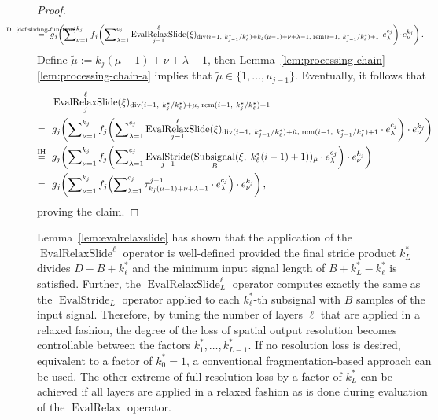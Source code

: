 \documentclass[journal]{IEEEtran}
\newcommand{\ROI}{B}
\newcommand{\discint}[2]{\{#1,\dotsc,#2\}}
\newcommand{\inint}[2]{\in\discint{#1}{#2}}
\DeclareMathOperator{\Subsignal}{Subsignal}
\DeclareMathOperator{\EvalStride}{EvalStride}
\renewcommand{\div}[2]{\operatorname{div}(#1,\ #2)}
\newcommand{\rem}[2]{\operatorname{rem}(#1,\ #2)}
\newcommand{\equsing}[1]{\overset{\mathclap{\text{#1}}}{=}}
\DeclareMathOperator{\EvalRelax}{EvalRelax}
\DeclareMathOperator{\EvalRelaxSlide}{EvalRelaxSlide}
\begin{document}
\begin{proof}
\begin{align*}
  \equsing{D.~\ref{def:sliding-function}}\ \ & g_j\!\left( \sum\nolimits_{\nu = 1}^{k_j} f_j\!\left( \sum\nolimits_{\lambda = 1}^{c_j}\EvalRelaxSlide_{j - 1}^\ell(\xi)_{\div{i - 1}{k_{j - 1}^* / k_\ell^*} + k_j(\mu - 1) + \nu + \lambda - 1,\;\rem{i - 1}{k_{j - 1}^* / k_\ell^*} + 1} \!\cdot\! e_\lambda^{c_j} \right) \!\cdot\! e_\nu^{k_j} \right)\text{.}
\end{align*}
Define $\tilde{\mu} := k_j(\mu - 1) + \nu + \lambda - 1$, then Lemma~\ref{lem:processing-chain}\ref{lem:processing-chain-a} implies that $\tilde{\mu}\inint{1}{u_{j - 1}}$.
Eventually, it follows that
\begin{align*}
  & \EvalRelaxSlide_j^\ell(\xi)_{\div{i - 1}{k_j^* / k_\ell^*} + \mu,\;\rem{i - 1}{k_j^* / k_\ell^*} + 1}\\
  =\ \ & g_j\!\left( \sum\nolimits_{\nu = 1}^{k_j} f_j\!\left( \sum\nolimits_{\lambda = 1}^{c_j}\EvalRelaxSlide_{j - 1}^\ell(\xi)_{\div{i - 1}{k_{j - 1}^* / k_\ell^*} + \tilde{\mu},\;\rem{i - 1}{k_{j - 1}^* / k_\ell^*} + 1} \cdot e_\lambda^{c_j} \right) \cdot e_\nu^{k_j} \right)\\
\equsing{IH}\ \ &g_j\!\left( \sum\nolimits_{\nu = 1}^{k_j} f_j\!\left( \sum\nolimits_{\lambda = 1}^{c_j}\EvalStride_{j - 1}(\Subsignal_\ROI(\xi,\; k_\ell^*(i - 1) + 1))_{\tilde{\mu}} \cdot e_\lambda^{c_j} \right) \cdot e_\nu^{k_j} \right)\\
  =\ \ & g_j\!\left( \sum\nolimits_{\nu = 1}^{k_j} f_j\!\left( \sum\nolimits_{\lambda = 1}^{c_j} \tau^{j - 1}_{k_j(\mu - 1) + \nu + \lambda - 1}\cdot e_\lambda^{c_j} \right) \cdot e_\nu^{k_j} \right)\text{,}
\end{align*}
proving the claim.
\end{proof}\begin{landscape}
\begin{figure}[p]
\centering
{}
\newsavebox{\figrelaxslidecaption}
\sbox{\figrelaxslidecaption}{\parbox{20.78mm}{\caption{}}}
\label{fig:relaxslide}
\end{figure}
\end{landscape}

Lemma~\ref{lem:evalrelaxslide} has shown that the application of the $\EvalRelaxSlide^\ell$ operator is well-defined provided the final stride product $k_L^*$ divides $D - \ROI + k_\ell^*$ and the minimum input signal length of $\ROI + k_L^* - k_\ell^*$ is satisfied.
Further, the $\EvalRelaxSlide_L^\ell$ operator computes exactly the same as the $\EvalStride_L$ operator applied to each $k_\ell^*$-th subsignal with $\ROI$ samples of the input signal.
Therefore, by tuning the number of layers $\ell$ that are applied in a relaxed fashion, the degree of the loss of spatial output resolution becomes controllable between the factors $k_1^*,\dotsc,k_{L - 1}^*$.
If no resolution loss is desired, equivalent to a factor of $k_0^* = 1$, a conventional fragmentation-based approach can be used.
The other extreme of full resolution loss by a factor of $k_L^*$ can be achieved if all layers are applied in a relaxed fashion as is done during evaluation of the $\EvalRelax$ operator.
\end{document}
